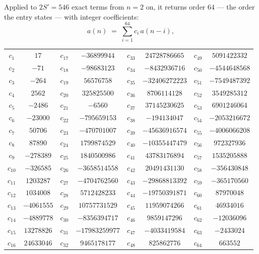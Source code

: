 \documentclass[11pt,a4paper]{article}
\theoremstyle{plain}
\theoremstyle{definition}
\begin{document}
Applied to $2S'=546$ exact terms from $n=2$ on, it returns order $64$ --- the
order the entry states --- with integer coefficients:
\[
a(n)\;=\;\sum_{i=1}^{64}c_i\,a(n-i),
\]
\begin{center}\small
\begin{tabular}{cccccccc}
$c_{1}$ & $17$ & $c_{17}$ & $-36899944$ & $c_{33}$ & $24728786665$ & $c_{49}$ & $5091422332$ \\
$c_{2}$ & $-71$ & $c_{18}$ & $-98683123$ & $c_{34}$ & $-8432936716$ & $c_{50}$ & $-4544648568$ \\
$c_{3}$ & $-264$ & $c_{19}$ & $56576758$ & $c_{35}$ & $-32406272223$ & $c_{51}$ & $-7549487392$ \\
$c_{4}$ & $2562$ & $c_{20}$ & $325825500$ & $c_{36}$ & $8706114128$ & $c_{52}$ & $3549285312$ \\
$c_{5}$ & $-2486$ & $c_{21}$ & $-6560$ & $c_{37}$ & $37145230625$ & $c_{53}$ & $6901246064$ \\
$c_{6}$ & $-23000$ & $c_{22}$ & $-795659153$ & $c_{38}$ & $-194134047$ & $c_{54}$ & $-2053216672$ \\
$c_{7}$ & $50706$ & $c_{23}$ & $-470701007$ & $c_{39}$ & $-45636916574$ & $c_{55}$ & $-4006066208$ \\
$c_{8}$ & $87890$ & $c_{24}$ & $1799874529$ & $c_{40}$ & $-10355447479$ & $c_{56}$ & $972327936$ \\
$c_{9}$ & $-278389$ & $c_{25}$ & $1840500986$ & $c_{41}$ & $43783176894$ & $c_{57}$ & $1535205888$ \\
$c_{10}$ & $-326585$ & $c_{26}$ & $-3658514558$ & $c_{42}$ & $20491431130$ & $c_{58}$ & $-356430848$ \\
$c_{11}$ & $1203287$ & $c_{27}$ & $-4704762560$ & $c_{43}$ & $-29868813392$ & $c_{59}$ & $-365170560$ \\
$c_{12}$ & $1034008$ & $c_{28}$ & $5712428233$ & $c_{44}$ & $-19750391871$ & $c_{60}$ & $87970048$ \\
$c_{13}$ & $-4061555$ & $c_{29}$ & $10757731529$ & $c_{45}$ & $11959074266$ & $c_{61}$ & $46934016$ \\
$c_{14}$ & $-4889778$ & $c_{30}$ & $-8356394717$ & $c_{46}$ & $9859147296$ & $c_{62}$ & $-12036096$ \\
$c_{15}$ & $13278826$ & $c_{31}$ & $-17983259977$ & $c_{47}$ & $-4033419584$ & $c_{63}$ & $-2433024$ \\
$c_{16}$ & $24633046$ & $c_{32}$ & $9465178177$ & $c_{48}$ & $825862776$ & $c_{64}$ & $663552$ \\
\end{tabular}
\end{center}
\end{document}
